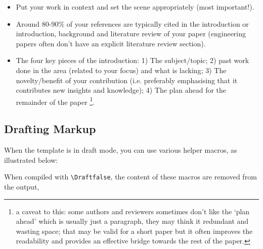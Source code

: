 \begin{itemize}
	\item Put your work in context and set the scene appropriately (most important!). 
	\item Around 80-90\% of your references are typically cited in the introduction or introduction, background and literature review of your paper (engineering papers often don't have an explicit literature review section).
	\item The four key pieces of the introduction: 1) The subject/topic; 2) past work done in the area (related to your focus) and what is lacking; 3) The novelty/benefit of your contribution (i.e. preferably emphasising that it contributes new insights and knowledge); 4) The plan ahead for the remainder of the paper \footnote{a caveat to this: some authors and reviewers sometimes don't like the `plan ahead' which is usually just a paragraph, they may think it redundant and wasting space; that may be valid for a short paper but it often improves the readability and provides an effective bridge towards the rest of the paper.}.
\end{itemize}






\subsection{Drafting Markup}

When the template is in draft mode, you can use various helper macros, as illustrated below:

      When compiled with \verb|\Draftfalse|, the content of these macros are removed from the output, 




